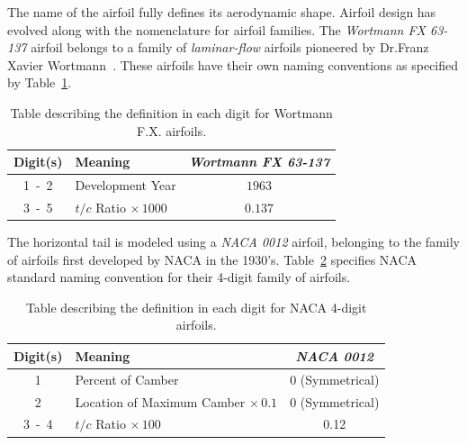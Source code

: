 \documentclass[12pt]{report}
\begin{document}
The name of the airfoil fully defines its aerodynamic shape. Airfoil design has evolved along with the nomenclature for airfoil families. The \textit{Wortmann FX 63{-}137} airfoil belongs to a family of \textit{laminar-flow} airfoils pioneered by Dr.Franz Xavier Wortmann~\cite{raymerAircraftDesignConceptual2018}. These airfoils have their own naming conventions as specified by Table~\ref{tbl:wortmanndigits}.

\begin{table}[!ht]\label{tbl:wortmanndigits}
  \caption{Table describing the definition in each digit for Wortmann F.X. airfoils.}
  \centering
  \begin{tabular}{clc}
    \toprule
    \textbf{Digit{(s)}} & \textbf{Meaning}                 & \textbf{\textit{Wortmann FX 63{-}137}} \\
    \midrule
    1~-~2               & Development Year                 & \(1963\)                               \\
    3~-~5               & \(t/c\) Ratio \(\times \, 1000\) & \(0.137\)                              \\
    \bottomrule
  \end{tabular}
\end{table}

The horizontal tail is modeled using a \textit{NACA 0012} airfoil, belonging to the family of airfoils first developed by NACA in the 1930's. Table~\ref{tbl:naca4digits} specifies NACA standard naming convention for their 4-digit family of airfoils.

\begin{table}[!ht]\label{tbl:naca4digits}
  \caption{Table describing the definition in each digit for NACA 4-digit airfoils.}
  \centering
  \begin{tabular}{clc}
    \toprule
    \textbf{Digit{(s)}} & \textbf{Meaning}                             & \textbf{\textit{NACA 0012}} \\
    \midrule
    1                   & Percent of Camber                            & 0 (Symmetrical)             \\
    2                   & Location of Maximum Camber \(\times \, 0.1\) & 0 (Symmetrical)             \\
    3~-~4               & \(t/c\) Ratio \(\times \, 100\)              & 0.12                        \\
    \bottomrule
  \end{tabular}
\end{table}
\end{document}
